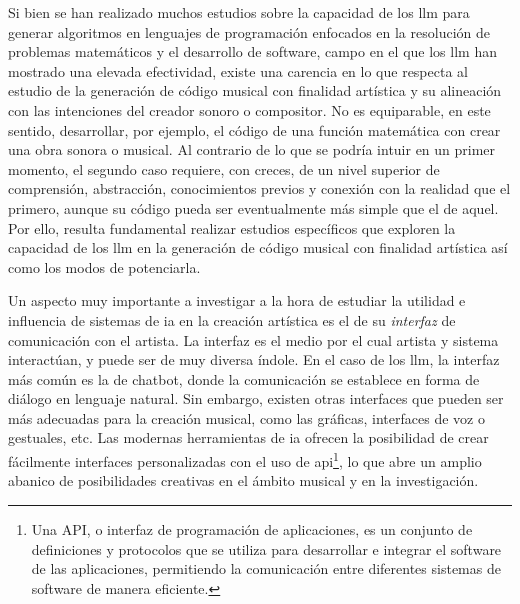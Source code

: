 Si bien se han realizado muchos estudios sobre la capacidad de los \gls{llm} para generar algoritmos en lenguajes de programación enfocados en la resolución de problemas matemáticos y el desarrollo de {software}, campo en el que los \gls{llm} han mostrado una elevada efectividad, existe una carencia en lo que respecta al estudio de la generación de código musical con finalidad artística y su alineación con las intenciones del creador sonoro o compositor. No es equiparable, en este sentido, desarrollar, por ejemplo, el código de una función matemática con crear una obra sonora o musical. Al contrario de lo que se podría intuir en un primer momento, el segundo caso requiere, con creces, de un nivel superior de comprensión, abstracción, conocimientos previos y conexión con la realidad que el primero, aunque su código pueda ser eventualmente más simple que el de aquel. Por ello, resulta fundamental realizar estudios específicos que exploren la capacidad de los \gls{llm} en la generación de código musical con finalidad artística así como los modos de potenciarla.

Un aspecto muy importante a investigar a la hora de estudiar la utilidad e influencia de sistemas de \gls{ia} en la creación artística es el de su \emph{interfaz} de comunicación con el artista. La interfaz es el medio por el cual artista y sistema interactúan, y puede ser de muy diversa índole. En el caso de los \gls{llm}, la interfaz más común es la de {chatbot}, donde la comunicación se establece en forma de diálogo en lenguaje natural. Sin embargo, existen otras interfaces que pueden ser más adecuadas para la creación musical, como las gráficas, interfaces de voz o gestuales, etc. Las modernas herramientas de \gls{ia} ofrecen la posibilidad de crear fácilmente interfaces personalizadas con el uso de \gls{api}\footnote{Una API, o interfaz de programación de aplicaciones, es un conjunto de definiciones y protocolos que se utiliza para desarrollar e integrar el software de las aplicaciones, permitiendo la comunicación entre diferentes sistemas de software de manera eficiente\citep{WikipediaAPI}.}, lo que abre un amplio abanico de posibilidades creativas en el ámbito musical y en la investigación.

